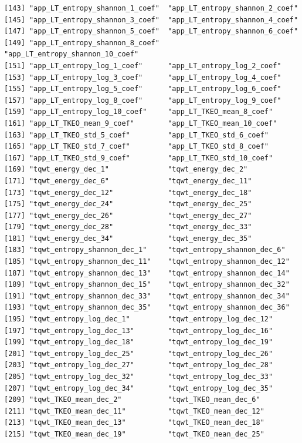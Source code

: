 \documentclass[
]{article}
\begin{document}
\begin{verbatim}
[143] "app_LT_entropy_shannon_1_coef"  "app_LT_entropy_shannon_2_coef" 
[145] "app_LT_entropy_shannon_3_coef"  "app_LT_entropy_shannon_4_coef" 
[147] "app_LT_entropy_shannon_5_coef"  "app_LT_entropy_shannon_6_coef" 
[149] "app_LT_entropy_shannon_8_coef"  "app_LT_entropy_shannon_10_coef"
[151] "app_LT_entropy_log_1_coef"      "app_LT_entropy_log_2_coef"     
[153] "app_LT_entropy_log_3_coef"      "app_LT_entropy_log_4_coef"     
[155] "app_LT_entropy_log_5_coef"      "app_LT_entropy_log_6_coef"     
[157] "app_LT_entropy_log_8_coef"      "app_LT_entropy_log_9_coef"     
[159] "app_LT_entropy_log_10_coef"     "app_LT_TKEO_mean_8_coef"       
[161] "app_LT_TKEO_mean_9_coef"        "app_LT_TKEO_mean_10_coef"      
[163] "app_LT_TKEO_std_5_coef"         "app_LT_TKEO_std_6_coef"        
[165] "app_LT_TKEO_std_7_coef"         "app_LT_TKEO_std_8_coef"        
[167] "app_LT_TKEO_std_9_coef"         "app_LT_TKEO_std_10_coef"       
[169] "tqwt_energy_dec_1"              "tqwt_energy_dec_2"             
[171] "tqwt_energy_dec_6"              "tqwt_energy_dec_11"            
[173] "tqwt_energy_dec_12"             "tqwt_energy_dec_18"            
[175] "tqwt_energy_dec_24"             "tqwt_energy_dec_25"            
[177] "tqwt_energy_dec_26"             "tqwt_energy_dec_27"            
[179] "tqwt_energy_dec_28"             "tqwt_energy_dec_33"            
[181] "tqwt_energy_dec_34"             "tqwt_energy_dec_35"            
[183] "tqwt_entropy_shannon_dec_1"     "tqwt_entropy_shannon_dec_6"    
[185] "tqwt_entropy_shannon_dec_11"    "tqwt_entropy_shannon_dec_12"   
[187] "tqwt_entropy_shannon_dec_13"    "tqwt_entropy_shannon_dec_14"   
[189] "tqwt_entropy_shannon_dec_15"    "tqwt_entropy_shannon_dec_32"   
[191] "tqwt_entropy_shannon_dec_33"    "tqwt_entropy_shannon_dec_34"   
[193] "tqwt_entropy_shannon_dec_35"    "tqwt_entropy_shannon_dec_36"   
[195] "tqwt_entropy_log_dec_1"         "tqwt_entropy_log_dec_12"       
[197] "tqwt_entropy_log_dec_13"        "tqwt_entropy_log_dec_16"       
[199] "tqwt_entropy_log_dec_18"        "tqwt_entropy_log_dec_19"       
[201] "tqwt_entropy_log_dec_25"        "tqwt_entropy_log_dec_26"       
[203] "tqwt_entropy_log_dec_27"        "tqwt_entropy_log_dec_28"       
[205] "tqwt_entropy_log_dec_32"        "tqwt_entropy_log_dec_33"       
[207] "tqwt_entropy_log_dec_34"        "tqwt_entropy_log_dec_35"       
[209] "tqwt_TKEO_mean_dec_2"           "tqwt_TKEO_mean_dec_6"          
[211] "tqwt_TKEO_mean_dec_11"          "tqwt_TKEO_mean_dec_12"         
[213] "tqwt_TKEO_mean_dec_13"          "tqwt_TKEO_mean_dec_18"         
[215] "tqwt_TKEO_mean_dec_19"          "tqwt_TKEO_mean_dec_25"         

\end{verbatim}
\end{document}
